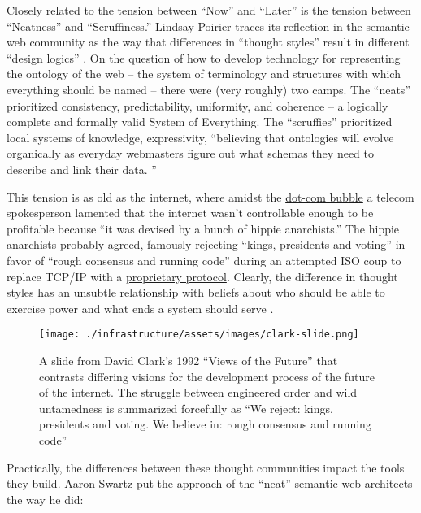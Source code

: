 Closely related to the tension between ``Now'' and ``Later'' is the
tension between ``Neatness'' and ``Scruffiness.'' Lindsay Poirier traces
its reflection in the semantic web community as the way that differences
in ``thought styles'' result in different ``design logics'' \citep{poirierTurnScruffyEthnographic2017} . On the question of how to
develop technology for representing the ontology of the web -- the
system of terminology and structures with which everything should be
named -- there were (very roughly) two camps. The ``neats'' prioritized
consistency, predictability, uniformity, and coherence -- a logically
complete and formally valid System of Everything. The ``scruffies''
prioritized local systems of knowledge, expressivity, ``believing that
ontologies will evolve organically as everyday webmasters figure out
what schemas they need to describe and link their data. \citep{poirierTurnScruffyEthnographic2017} ''

This tension is as old as the internet, where amidst the
\href{https://en.wikipedia.org/wiki/Dot-com_bubble}{dot-com bubble} a
telecom spokesperson lamented that the internet wasn't controllable
enough to be profitable because ``it was devised by a bunch of hippie
anarchists.'' \citep{hiltzikTamingWildWild2001}  The hippie
anarchists probably agreed, famously rejecting ``kings, presidents and
voting'' in favor of ``rough consensus and running code'' during an
attempted ISO coup to replace TCP/IP with a
\href{https://www.iso.org/standard/35872.html}{proprietary protocol}.
Clearly, the difference in thought styles has an unsubtle relationship
with beliefs about who should be able to exercise power and what ends a
system should serve \citep{larsenPoliticalNatureTCP2012} .

\begin{figure}
\texttt{[image: ./infrastructure/assets/images/clark-slide.png]}
\label{fig:davidclark}
\caption{A
slide from David Clark's 1992 ``Views of the Future''\citep{clarkCloudyCrystalBall1992}  that contrasts differing visions for the
development process of the future of the internet. The struggle between
engineered order and wild untamedness is summarized forcefully as ``We
reject: kings, presidents and voting. We believe in: rough consensus and
running code''}
\end{figure}

Practically, the differences between these thought communities impact
the tools they build. Aaron Swartz put the approach of the ``neat''
semantic web architects the way he did:

